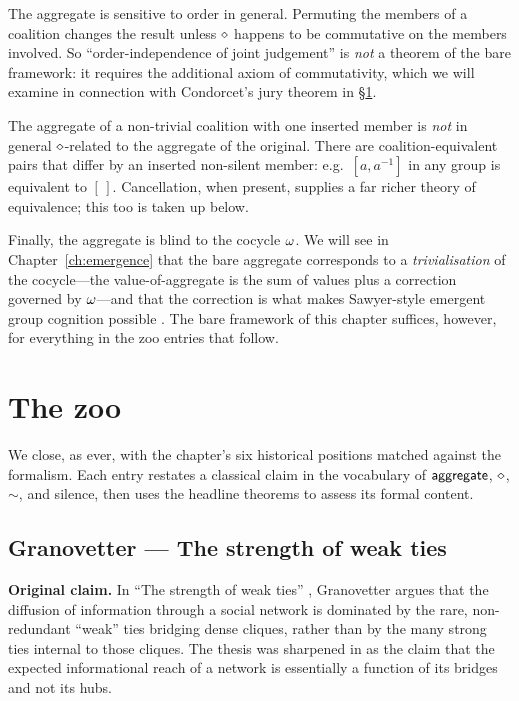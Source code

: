 The aggregate is sensitive to order in general. Permuting the members
of a coalition changes the result unless $\mathbin{\diamond}$ happens to be
commutative on the members involved. So
``order-independence of joint judgement'' is \emph{not} a theorem of
the bare framework: it requires the additional axiom of commutativity,
which we will examine in connection with Condorcet's jury theorem in
\S\ref{sec:zoo}.

The aggregate of a non-trivial coalition with one inserted member is
\emph{not} in general $\mathbin{\diamond}$-related to the aggregate of the
original. There are coalition-equivalent pairs that differ by an
inserted non-silent member: e.g.~$[a, a^{-1}]$ in any group is
equivalent to $[\,]$. Cancellation, when present, supplies a far
richer theory of equivalence; this too is taken up below.

Finally, the aggregate is blind to the cocycle $\omega$. We will see
in Chapter~\ref{ch:emergence} that the bare aggregate corresponds to a
\emph{trivialisation} of the cocycle---the value-of-aggregate is the
sum of values plus a correction governed by $\omega$---and that the
correction is what makes Sawyer-style emergent group cognition
possible \cite{Sawyer2005}. The bare framework of this chapter
suffices, however, for everything in the zoo entries that follow.

\section{The zoo}\label{sec:zoo}

We close, as ever, with the chapter's six historical positions
matched against the formalism. Each entry restates a classical claim
in the vocabulary of $\mathsf{aggregate}$, $\mathbin{\diamond}$, $\sim$, and
silence, then uses the headline theorems to assess its formal
content.

\subsection*{Granovetter --- The strength of weak ties}

\begin{zooentry*}\end{zooentry*}

\textbf{Original claim.} In ``The strength of weak ties''
\cite{Granovetter1973}, Granovetter argues that the diffusion of
information through a social network is dominated by the rare,
non-redundant ``weak'' ties bridging dense cliques, rather than by
the many strong ties internal to those cliques. The thesis was
sharpened in \cite{GranovetterStrength1983} as the claim that the
expected informational reach of a network is essentially a function
of its bridges and not its hubs.

